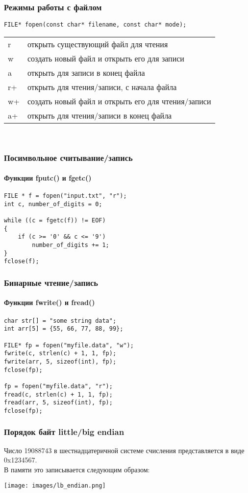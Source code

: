 \documentclass[12pt,pdf,hyperref={unicode}]{beamer}
\begin{document}
\begin{frame}[fragile]
\frametitle{Режимы работы с файлом} 
\begin{lstlisting}
FILE* fopen(const char* filename, const char* mode);
\end{lstlisting}
\begin{tabular}{ l || l }
  r & открыть существующий файл для чтения \\
  w & создать новый файл и открыть его для записи \\
  a & открыть для записи в конец файла \\
  r+ & открыть для чтения/записи, с начала файла  \\
  w+ & создать новый файл и открыть его для чтения/записи \\
  a+ & открыть для чтения/записи в конец файла \\
\end{tabular}\\
\end{frame}


\begin{frame}[fragile]
\frametitle{Посимвольное считывание/запись}  
\framesubtitle{Функции fputc() и fgetc()}  
\begin{lstlisting}
FILE * f = fopen("input.txt", "r");
int c, number_of_digits = 0;

while ((c = fgetc(f)) != EOF)
{
    if (c >= '0' && c <= '9')
        number_of_digits += 1;
}
fclose(f);
\end{lstlisting}
\end{frame}


\begin{frame}[fragile]
\frametitle{Бинарные чтение/запись}  
\framesubtitle{Функции fwrite() и fread()}  
\begin{lstlisting}
char str[] = "some string data";
int arr[5] = {55, 66, 77, 88, 99};

FILE* fp = fopen("myfile.data", "w");
fwrite(c, strlen(c) + 1, 1, fp);
fwrite(arr, 5, sizeof(int), fp);
fclose(fp);

fp = fopen("myfile.data", "r");
fread(c, strlen(c) + 1, 1, fp);
fread(arr, 5, sizeof(int), fp);
fclose(fp);
\end{lstlisting}
\end{frame}

\begin{frame}[fragile]
\frametitle{Порядок байт little/big endian} 
Число 19088743 в шестнадцатеричной системе счисления представляется в виде 0x1234567.\\
В памяти это записывается следующим образом:
\begin{center}
\texttt{[image: images/lb\_endian.png]}
\end{center}
\end{frame}
\end{document}
